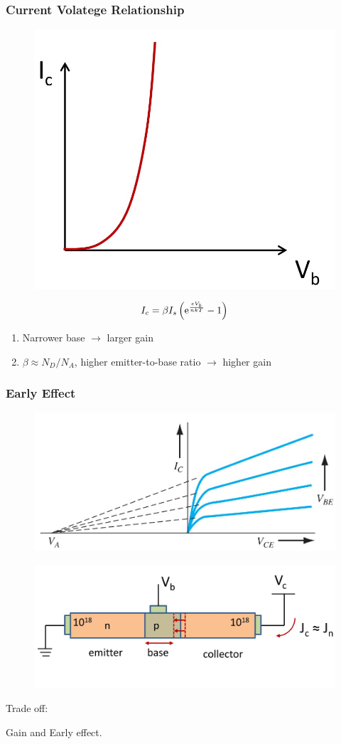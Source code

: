 \documentclass{beamer}
\begin{document}
    \begin{frame} \frametitle{Current Volatege Relationship}
        \begin{figure}[H]
            \centering
            \includegraphics[width=0.4\linewidth]{BJT-I-V-curve.jpg}
            \label{fig:BJT-I-V-curve.jpg}
        \end{figure}
        \begin{equation*}
            \begin{aligned}
                I_c = \beta I_s \left( \mathrm{e}^{\frac{eV_b}{nkT} } - 1 \right)
            \end{aligned}
        \end{equation*}
        \begin{enumerate}[1.]
            \item Narrower base $\rightarrow$ larger gain
            \item $\beta \approx N_D / N_A$, higher emitter-to-base ratio $\rightarrow$ higher gain
        \end{enumerate}
    \end{frame}
    
    \begin{frame} \frametitle{Early Effect}
        \begin{figure}[H]
            \centering
            \includegraphics[width=0.6\linewidth]{Early-effect.jpg}
            \label{fig:Early-effect.jpg}
        \end{figure}
        \begin{figure}[H]
            \centering
            \includegraphics[width=0.6\linewidth]{BJT-two-pn.jpg}
            \label{fig:BJT-two-pn-early-effect.jpg}
        \end{figure}
        \par Trade off:
        \par \qquad Gain and Early effect.
        
    \end{frame}
\end{document}
